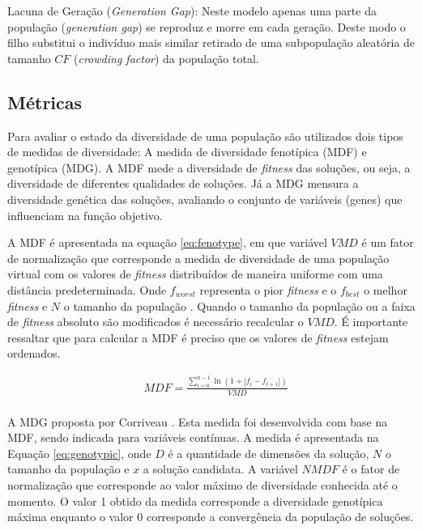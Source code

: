 Lacuna de Geração (\textit{Generation Gap}): Neste modelo apenas uma parte da população (\textit{generation gap}) se reproduz e morre em cada geração. Deste modo o filho substitui o indivíduo mais similar retirado de uma subpopulação aleatória de tamanho $CF$ (\textit{crowding factor}) da população total.

\subsection{Métricas}
\label{sec:evaluete_diversity}

Para avaliar o estado da diversidade de uma população são utilizados dois tipos de medidas de diversidade: A medida de diversidade fenotípica (MDF) e genotípica (MDG). A MDF mede a diversidade de \textit{fitness} das soluções, ou seja, a diversidade de diferentes qualidades de soluções. Já a MDG mensura a diversidade genética das soluções, avaliando o conjunto de variáveis (genes) que influenciam na função objetivo.

A MDF é apresentada na equação \ref{eq:fenotype}, em que variável $VMD$ é um fator de normalização que corresponde a medida de diversidade de uma população virtual com os valores de \textit{fitness} distribuídos de maneira uniforme com uma distância predeterminada. Onde $f_{worst}$ representa o pior \textit{fitness} e o $f_{best}$ o melhor \textit{fitness} e $N$ o tamanho da população \cite{phenotypic}. Quando o tamanho da população ou a faixa de \textit{fitness} absoluto são modificados é necessário recalcular o $VMD$. É importante ressaltar que para calcular a MDF é preciso que os valores de \textit{fitness} estejam ordenados.

\begin{equation}
\label{eq:fenotype}
\begin{split}
& MDF = \frac{\sum_{i=0}^{n-1} \ln(1 + |f_i - f_{i+1}|)}{VMD} \\
\end{split}
\end{equation}

A MDG  proposta por Corriveau \cite{genotypic}. Esta medida foi desenvolvida com base na MDF, sendo indicada para variáveis contínuas. A medida é apresentada na Equação \ref{eq:genotypic}, onde $D$ é a quantidade de dimensões da solução, $N$ o tamanho da população e $x$ a solução candidata. A variável
$NMDF$ é o fator de normalização que corresponde ao valor máximo de diversidade conhecida até o momento. O valor 1 obtido da medida corresponde a diversidade genotípica máxima enquanto o valor 0 corresponde a convergência da população de soluções.

